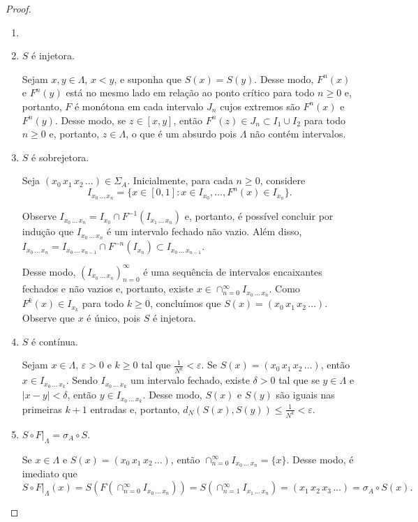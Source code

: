 \begin{proof}
\begin{enumerate}[label=\alph*)]\item[]
\item $S$ é injetora.

Sejam $x, y \in \Lambda$, $x < y$, e suponha que $S(x) = S(y)$. Desse modo, $F^n(x)$ e $F^n(y)$ está no mesmo lado em relação ao ponto crítico para todo $n \geq 0$ e, portanto, $F$ é monótona em cada intervalo $J_n$ cujos extremos são $F^n(x)$ e $F^n(y)$. Desse modo, se $z \in [x, y]$, então $F^n(z) \in J_n \subset I_1 \cup I_2$ para todo $n \geq 0$ e, portanto, $z \in \Lambda$, o que é um absurdo pois $\Lambda$ não contém intervalos.

\item $S$ é sobrejetora.

Seja $(x_0 \, x_1 \, x_2 \, \dots) \in \Sigma_A$. Inicialmente, para cada $n \geq 0$, considere
$$I_{x_0 \, \dots \, x_n} = \lbrace x \in [0,1] : x \in I_{x_0}, \dots, F^n(x) \in I_{x_n} \rbrace.$$

Observe $I_{x_0 \, \dots \, x_n} = I_{x_0} \cap F^{-1}(I_{x_1 \, \dots \, x_n})$ e, portanto, é possível concluir por indução que $I_{x_0 \, \dots \, x_n}$ é um intervalo fechado não vazio. Além disso, $I_{x_0 \, \dots \, x_n} = I_{x_0 \, \dots \, x_{n-1}} \cap F^{-n}(I_{x_n}) \subset I_{x_0 \, \dots \, x_{n-1}}$.

Desse modo, $(I_{x_0 \, \dots \, x_n})_{n=0}^\infty$ é uma sequência de intervalos encaixantes fechados e não vazios e, portanto, existe $x \in \cap_{n=0}^\infty I_{x_0 \, \dots \, x_n}$. Como $F^k(x) \in I_{x_k}$ para todo $k \geq 0$, concluímos que $S(x) = (x_0 \, x_1 \, x_2 \, \dots)$. Observe que $x$ é único, pois $S$ é injetora.

\item $S$ é contínua.

Sejam $x \in \Lambda$, $\varepsilon > 0$ e $k \geq 0$ tal que $\frac{1}{N^k} < \varepsilon$. Se $S(x) = (x_0 \, x_1 \, x_2 \, \dots)$, então $x \in I_{x_0 \, \dots \, x_k}$. Sendo $I_{x_0 \, \dots \, x_k}$ um intervalo fechado, existe $\delta > 0$ tal que se $y \in \Lambda$ e $|x-y| < \delta$, então $y \in I_{x_0 \, \dots \, x_k}$. Desse modo, $S(x)$ e $S(y)$ são iguais nas primeiras $k+1$ entradas e, portanto, $d_N(S(x), S(y)) \leq \frac{1}{N^k} < \varepsilon$.

\item $S \circ F|_\Lambda = \sigma_A \circ S$.

Se $x \in \Lambda$ e $S(x) = (x_0 \, x_1 \, x_2 \, \dots)$, então $\cap_{n=0}^\infty I_{x_0 \, \dots \, x_n} = \lbrace x \rbrace$. Desse modo, é imediato que
$$ S \circ F|_{\Lambda}(x) = S(F(\cap_{n=0}^\infty I_{x_0 \, \dots \, x_n})) = S(\cap_{n=1}^\infty I_{x_1 \, \dots \, x_n}) = (x_1 \, x_2 \, x_3 \, \dots)  = \sigma_A \circ S(x).$$
\end{enumerate}
\end{proof}
